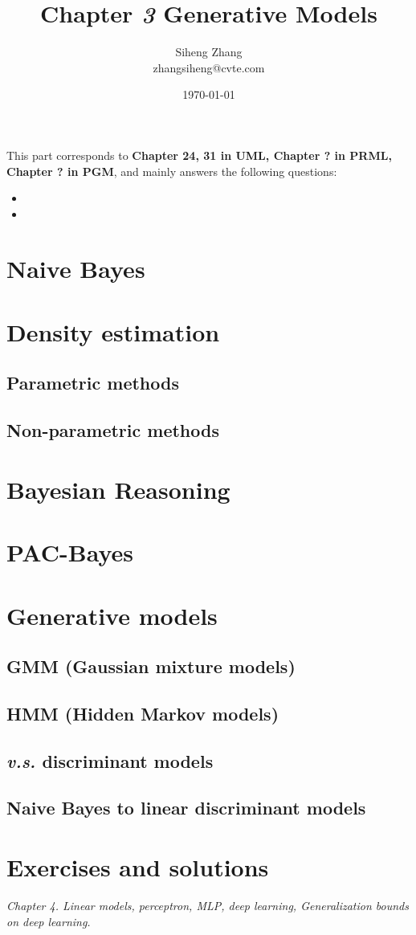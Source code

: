 \documentclass{article}
\author{Siheng Zhang\\zhangsiheng@cvte.com}
\title{Chapter \textbf{\textit{3}} Generative Models}
\date{\today}
\begin{document}
\maketitle  

This part corresponds to \textbf{Chapter 24, 31 in UML, Chapter ? in PRML, Chapter ? in PGM}, and mainly answers the following questions:

\begin{itemize}
\item 
\item 
\end{itemize}

\tableofcontents
\newpage

\section{Naive Bayes}

\section{Density estimation}
	\subsection{Parametric methods}
	\subsection{Non-parametric methods}

\section{Bayesian Reasoning}

\section{PAC-Bayes}

\section{Generative models}
	\subsection{GMM (Gaussian mixture models)}
	\subsection{HMM (Hidden Markov models)}
	\subsection{\textit{v.s.} discriminant models}
	\subsection{Naive Bayes to linear discriminant models}


\section{Exercises and solutions}

\textit{
      Chapter 4. Linear models, perceptron, MLP, deep learning, Generalization bounds on deep learning.}
\end{document}
